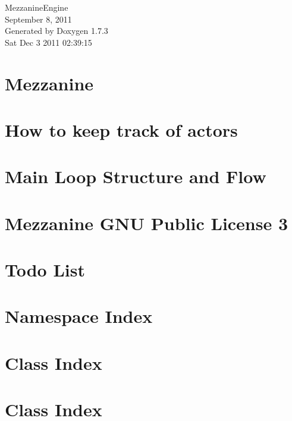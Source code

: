 \documentclass[a4paper]{article}
\begin{document}
\hypersetup{pageanchor=false}
\begin{titlepage}
\vspace*{7cm}
\begin{center}
{\Large MezzanineEngine \\[1ex]\large September 8, 2011 }\\
\vspace*{1cm}
{\large Generated by Doxygen 1.7.3}\\
\vspace*{0.5cm}
{\small Sat Dec 3 2011 02:39:15}\\
\end{center}
\end{titlepage}
\tableofcontents
{}
\hypersetup{pageanchor=true}
\section{Mezzanine}
\label{index}\hypertarget{index}{}
\section{How to keep track of actors}
\label{actorcontainer1}
\hypertarget{actorcontainer1}{}

\section{Main Loop Structure and Flow}
\label{mainloop1}
\hypertarget{mainloop1}{}

\section{Mezzanine GNU Public License 3}
\label{GPLLicense}
\hypertarget{GPLLicense}{}

\section{Todo List}
\label{todo}
\hypertarget{todo}{}

\section{Namespace Index}

\section{Class Index}

\section{Class Index}

\end{document}
